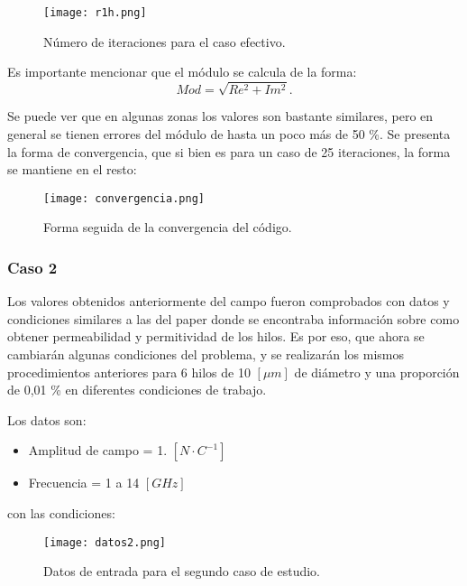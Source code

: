 \documentclass[12pt,letterpaper]{article}
\numberwithin{equation}{section}
\begin{document}
\begin{figure}[H]
	\centering\texttt{[image: r1h.png]}\\
	\caption{Número de iteraciones para el caso efectivo.}
	\label{fig:r1h}
\end{figure} 

Es importante mencionar que el módulo se calcula de la forma:
\begin{equation}
Mod = \sqrt{Re^2 + Im^2}.
\end{equation}

Se puede ver que en algunas zonas los valores son bastante similares, pero en general se tienen errores del módulo de hasta un poco más de 50 \%. Se presenta la forma de convergencia, que si bien es para un caso de 25 iteraciones, la forma se mantiene en el resto:

\begin{figure}[H]
	\centering\texttt{[image: convergencia.png]}\\
	\caption{Forma seguida de la convergencia del código.}
	\label{fig:convergencia}
\end{figure} 




\subsubsection{Caso 2}

Los valores obtenidos anteriormente del campo fueron comprobados con datos y condiciones similares a las del paper donde se encontraba información sobre como obtener permeabilidad y permitividad de los hilos. \cite{Wire_theory_2} Es por eso, que ahora se cambiarán algunas condiciones del problema, y se realizarán los mismos procedimientos anteriores para 6 hilos de 10 $[\mu m]$ de diámetro y una proporción de 0,01 \% en diferentes condiciones de trabajo. \cite{Wire_theory_1}

Los datos son:

\begin{itemize}
	\item Amplitud de campo = 1. $[N \cdotp C^{-1}]$
	\item Frecuencia = 1 a 14 $[GHz]$
\end{itemize}

con las condiciones:

\begin{figure}[H]
	\centering\texttt{[image: datos2.png]}\\
	\caption{Datos de entrada para el segundo caso de estudio.}
	\label{fig:datos2}
\end{figure} 
\end{document}
